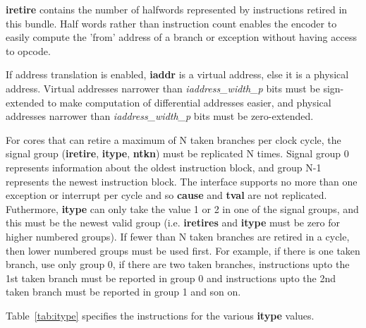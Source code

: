 \textbf {iretire} contains the number of halfwords represented by
instructions retired in this bundle. Half words rather than
instruction count enables the encoder to easily compute the 'from'
address of a branch or exception without having access to opcode.

If address translation is enabled, \textbf {iaddr} is a virtual
address, else it is a physical address. Virtual addresses narrower
than \textit{iaddress\_width\_p} bits must be sign-extended to make
computation of differential addresses easier, and physical addresses
narrower than \textit{iaddress\_width\_p} bits must be zero-extended.

For cores that can retire a maximum of N taken branches per clock
cycle, the signal group (\textbf{iretire}, \textbf{itype},
\textbf{ntkn}) must be replicated N times. Signal group 0
represents information about the oldest instruction block, and group N-1
represents the newest instruction block. The interface supports no more
than one exception or interrupt per cycle and so \textbf{cause} and
\textbf{tval} are not replicated. Futhermore, \textbf{itype} can only
take the value 1 or 2 in one of the signal groups, and this must be
the newest valid group (i.e. \textbf{iretires} and \textbf{itype} must
be zero for higher numbered groups). If fewer than N taken branches
are retired in a cycle, then lower numbered groups must be used
first. For example, if there is one taken branch, use only group 0, if
there are two taken branches, instructions upto the 1st taken branch
must be reported in group 0 and instructions upto the 2nd taken branch
must be reported in group 1 and son on.

Table~\ref{tab:itype} specifies the instructions for the various \textbf{itype} values.


